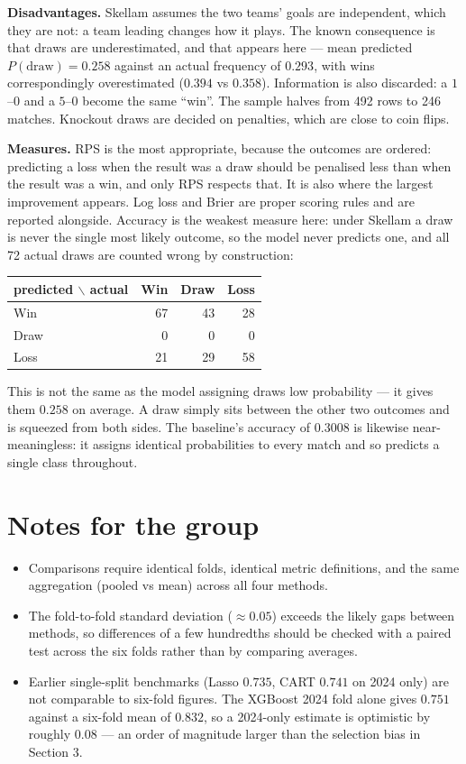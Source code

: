 \documentclass[11pt,a4paper]{article}
\begin{document}
\textbf{Disadvantages.} Skellam assumes the two teams' goals are
independent, which they are not: a team leading changes how it plays. The
known consequence is that draws are underestimated, and that appears here
--- mean predicted $P(\text{draw}) = 0.258$ against an actual frequency of
$0.293$, with wins correspondingly overestimated ($0.394$ vs $0.358$).
Information is also discarded: a $1$--$0$ and a $5$--$0$ become the same
``win''. The sample halves from 492 rows to 246 matches. Knockout draws
are decided on penalties, which are close to coin flips.

\textbf{Measures.} RPS is the most appropriate, because the outcomes are
ordered: predicting a loss when the result was a draw should be penalised
less than when the result was a win, and only RPS respects that. It is
also where the largest improvement appears. Log loss and Brier are proper
scoring rules and are reported alongside. Accuracy is the weakest measure
here: under Skellam a draw is never the single most likely outcome, so the
model never predicts one, and all 72 actual draws are counted wrong by
construction:

\begin{center}
\begin{tabular}{lrrr}
  \toprule
  predicted $\backslash$ actual & Win & Draw & Loss \\
  \midrule
  Win  & 67 & 43 & 28 \\
  Draw &  0 &  0 &  0 \\
  Loss & 21 & 29 & 58 \\
  \bottomrule
\end{tabular}
\end{center}

This is not the same as the model assigning draws low probability --- it
gives them $0.258$ on average. A draw simply sits between the other two
outcomes and is squeezed from both sides. The baseline's accuracy of
$0.3008$ is likewise near-meaningless: it assigns identical probabilities
to every match and so predicts a single class throughout.


\section{Notes for the group}

\begin{itemize}
  \item Comparisons require identical folds, identical metric
        definitions, and the same aggregation (pooled vs mean) across all
        four methods.
  \item The fold-to-fold standard deviation ($\approx 0.05$) exceeds the
        likely gaps between methods, so differences of a few hundredths
        should be checked with a paired test across the six folds rather
        than by comparing averages.
  \item Earlier single-split benchmarks (Lasso $0.735$, CART $0.741$ on
        2024 only) are not comparable to six-fold figures. The XGBoost
        2024 fold alone gives $0.751$ against a six-fold mean of $0.832$,
        so a 2024-only estimate is optimistic by roughly $0.08$ --- an
        order of magnitude larger than the selection bias in Section 3.
\end{itemize}
\end{document}
